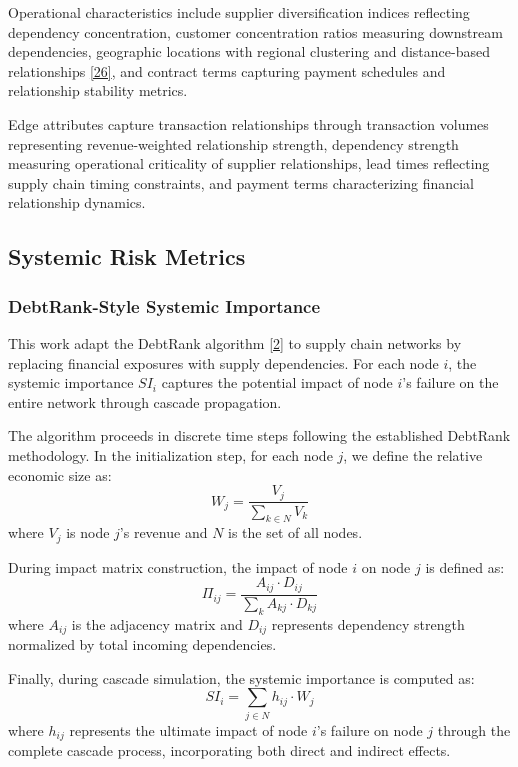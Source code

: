 \documentclass[a4 paper, 11pt,twoside]{article}
\newcommand{\0}{\Bf{0}}
\theoremstyle{definition}
\begin{document}
Operational characteristics include supplier diversification indices reflecting dependency concentration, customer concentration ratios measuring downstream dependencies, geographic locations with regional clustering and distance-based relationships \hyperref[ref26]{[26]}, and contract terms capturing payment schedules and relationship stability metrics.

Edge attributes capture transaction relationships through transaction volumes representing revenue-weighted relationship strength, dependency strength measuring operational criticality of supplier relationships, lead times reflecting supply chain timing constraints, and payment terms characterizing financial relationship dynamics.

\subsection{Systemic Risk Metrics}

\subsubsection{DebtRank-Style Systemic Importance}

This work adapt the DebtRank algorithm \hyperref[ref2]{[2]} to supply chain networks by replacing financial exposures with supply dependencies. For each node $i$, the systemic importance $SI_i$ captures the potential impact of node $i$'s failure on the entire network through cascade propagation.

The algorithm proceeds in discrete time steps following the established DebtRank methodology. In the initialization step, for each node $j$, we define the relative economic size as:
\begin{equation}
W_j = \frac{V_j}{\sum_{k \in N} V_k}
\end{equation}
where $V_j$ is node $j$'s revenue and $N$ is the set of all nodes.

During impact matrix construction, the impact of node $i$ on node $j$ is defined as:
\begin{equation}
\Pi_{ij} = \frac{A_{ij} \cdot D_{ij}}{\sum_{k} A_{kj} \cdot D_{kj}}
\end{equation}
where $A_{ij}$ is the adjacency matrix and $D_{ij}$ represents dependency strength normalized by total incoming dependencies.

Finally, during cascade simulation, the systemic importance is computed as:
\begin{equation}
SI_i = \sum_{j \in N} h_{ij} \cdot W_j
\end{equation}
where $h_{ij}$ represents the ultimate impact of node $i$'s failure on node $j$ through the complete cascade process, incorporating both direct and indirect effects.
\end{document}
